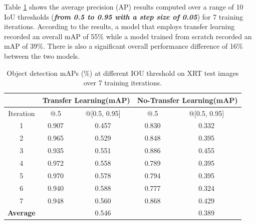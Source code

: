 \documentclass[conference]{IEEEtran}
\begin{document}
		Table \ref{table} shows the average precision (AP) results computed over a range of 10 IoU thresholds (\textbf{\textit{from 0.5 to 0.95 with a step size of 0.05}}) for 7 training iterations. According to the results, a model that employs transfer learning recorded an
overall mAP of 55\% while a model trained from scratch recorded an mAP of 39\%. There is also a significant
overall performance difference of 16\% between the two models.
		
		
		\begin{table}[htbp]
			\caption{Object detection mAPs (\%) at different IOU threshold on XRT test images over 7 training iterations.} 
			\centering
			\begin{tabular}{|c|c|c|c|c|}
				\hline
				& \multicolumn{2}{|c|}{\textbf{Transfer Learning\newline (mAP)}}
				& \multicolumn{2}{|c|}{\textbf{No-Transfer Learning\newline (mAP)}}\\ 
				
				\hline
				Iteration & @.5 & @[0.5, 0.95] & @.5 & @[0.5, 0.95]\\
				
				\hline
				1 & 0.907 & 0.457  & 0.830 & 0.332\\
				
				\hline
				2 & 0.965 & 0.529 & 0.848 & 0.395\\
				
				\hline
				3 & 0.935 & 0.551 & 0.886 & 0.455\\
				
				\hline
				4 & 0.972 & 0.558 & 0.789 & 0.395\\
				
				\hline
				5 & 0.970 & 0.578& 0.794 & 0.395 \\
				\hline
				
				6 & 0.940 & 0.588 & 0.777 & 0.324\\
				
				\hline
				7 & 0.948 & 0.560& 0.868 & 0.429 \\
				\hline
				\textbf{Average}& & 0.546& & 0.389\\	
				\hline	
			\end{tabular} 
			\label{table}
		\end{table}
\end{document}
